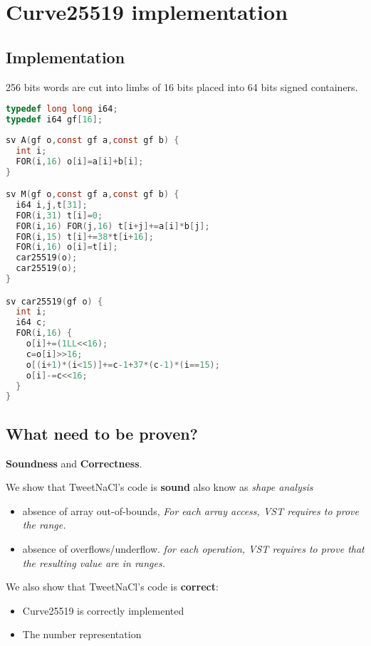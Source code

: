 \section{Curve25519 implementation}

\subsection{Implementation}

256 bits words are cut into limbs of 16 bits placed into 64 bits signed
containers.
\begin{lstlisting}[language=C]
typedef long long i64;
typedef i64 gf[16];
\end{lstlisting}

\begin{lstlisting}[language=C]
sv A(gf o,const gf a,const gf b) {
  int i;
  FOR(i,16) o[i]=a[i]+b[i];
}

sv M(gf o,const gf a,const gf b) {
  i64 i,j,t[31];
  FOR(i,31) t[i]=0;
  FOR(i,16) FOR(j,16) t[i+j]+=a[i]*b[j];
  FOR(i,15) t[i]+=38*t[i+16];
  FOR(i,16) o[i]=t[i];
  car25519(o);
  car25519(o);
}

sv car25519(gf o) {
  int i;
  i64 c;
  FOR(i,16) {
    o[i]+=(1LL<<16);
    c=o[i]>>16;
    o[(i+1)*(i<15)]+=c-1+37*(c-1)*(i==15);
    o[i]-=c<<16;
  }
}
\end{lstlisting}

\subsection{What need to be proven?}

\textbf{Soundness} and \textbf{Correctness}.

We show that TweetNaCl's code is \textbf{sound} also know as \textit{shape analysis} \ie

\begin{itemize}
\item absence of array out-of-bounds,
\textit{For each array access, VST requires to prove the range.}
\item absence of overflows/underflow.
\textit{for each operation, VST requires to prove that the resulting value are in ranges.}
\end{itemize}

We also show that TweetNaCl's code is \textbf{correct}:

\begin{itemize}
\item Curve25519 is correctly implemented
\item The number representation
\end{itemize}

